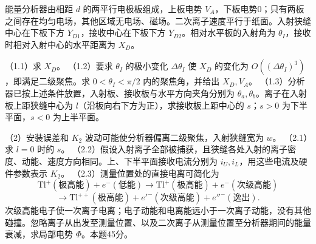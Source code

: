 \documentclass[12pt,a4paper,fontset=fandol]{ctexart}
\begin{document}
\begin{center}
\begin{minipage}{\linewidth}
\centering\begingroup
{}
\ifdim\wd\diagrambox>.88\linewidth
\sbox{\diagrambox}{\resizebox{.88\linewidth}{!}{\usebox{\diagrambox}}}
\fi
\ifdim\ht\diagrambox>.40\textheight
\resizebox{!}{.40\textheight}{\usebox{\diagrambox}}
\else\usebox{\diagrambox}\fi
\par{}
\endgroup\end{minipage}
\end{center}

能量分析器由相距 \(d\) 的两平行电极板组成，上板电势
\(V_A\)，下板电势0；只有两板之间存在均匀电场，其他区域无电场、磁场。二次离子速度平行于纸面。入射狭缝中心在下板下方
\(Y_{D1}\)，接收中心在下板下方 \(Y_{D2}\)。相对水平板的入射角为
\(\theta_I\)，接收时相对入射中心的水平距离为 \(X_D\)。

（1.1）求 \(X_D\)。 （1.2）要求 \(\theta_I\) 的极小变化
\(\Delta\theta_I\) 使 \(X_D\) 的变化为
\(O((\Delta\theta_I)^3)\)，即满足二级聚焦。求 \(0<\theta_I<\pi/2\)
内的聚焦角，并给出 \(X_D,V_A\)。
（1.3）分析器已按上述条件放置，入射板、接收板与水平方向夹角分别为
\(\theta_a,\theta_b\)。离子在入射板上距狭缝中心为
\(l\)（沿板向右下方为正），求接收板上距中心的 \(s\)；\(s>0\)
为下半平面，\(s<0\) 为上半平面。

（2）安装误差和 \(K_2\) 波动可能使分析器偏离二级聚焦，入射狭缝宽为
\(w\)。 （2.1）求 \(l=0\) 时的 \(s\)。
（2.2）假设入射离子全部被捕获，且狭缝各处入射的离子密度、动能、速度方向相同。上、下半平面接收电流分别为
\(i_U,i_L\)，用这些电流及硬件参数表示 \(K_2\)。
（2.3）测量位置处的直接电离可简化为 \[
\mathrm{Tl}^+(\text{极高能})+e^-(\text{低能})
\longrightarrow \mathrm{Tl}^+(\text{极高能})+e^-(\text{次级高能})
\] \[
\longrightarrow
\mathrm{Tl}^{++}(\text{极高能})+e'^-(\text{次级高能})+e''^-(\text{逸出}).
\]
次级高能电子使一次离子电离；电子动能和电离能远小于一次离子动能，没有其他碰撞。忽略离子从出发至测量位置、以及二次离子从测量位置至分析器期间的能量衰减，求局部电势
\(\Phi\)。本题45分。
\end{document}
